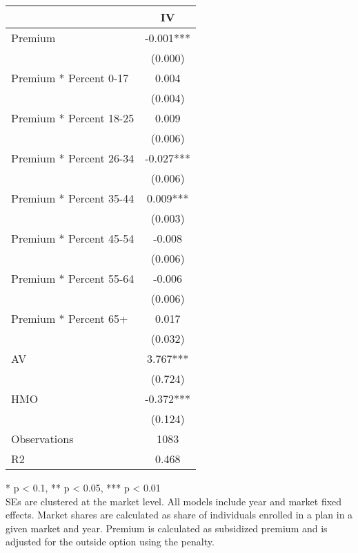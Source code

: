\setlength{\LTpost}{0mm}
\begin{longtable}{lc}
\toprule
  & IV \\ 
\midrule\addlinespace[2.5pt]
Premium & -0.001*** \\ 
 & (0.000) \\ 
Premium * Percent 0-17 & 0.004 \\ 
 & (0.004) \\ 
Premium * Percent 18-25 & 0.009 \\ 
 & (0.006) \\ 
Premium * Percent 26-34 & -0.027*** \\ 
 & (0.006) \\ 
Premium * Percent 35-44 & 0.009*** \\ 
 & (0.003) \\ 
Premium * Percent 45-54 & -0.008 \\ 
 & (0.006) \\ 
Premium * Percent 55-64 & -0.006 \\ 
 & (0.006) \\ 
Premium * Percent 65+ & 0.017 \\ 
 & (0.032) \\ 
AV & 3.767*** \\ 
 & (0.724) \\ 
HMO & -0.372*** \\ 
 & (0.124) \\ 
Observations & 1083 \\ 
R2 & 0.468 \\ 
\bottomrule
\end{longtable}
\begin{minipage}{\linewidth}
* p < 0.1, ** p < 0.05, *** p < 0.01\\
SEs are clustered at the market level. All models include year and market fixed effects. 
                   Market shares are calculated as share of individuals enrolled in a plan in a given market and year. 
                   Premium is calculated as subsidized premium and is adjusted for the outside option using the penalty.\\
\end{minipage}

